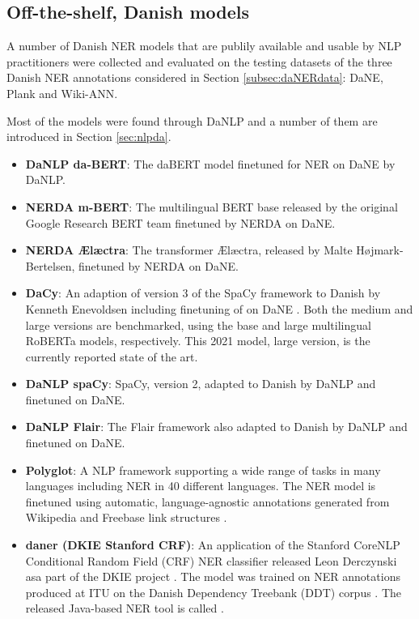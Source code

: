 \documentclass[main.tex]{subfiles}
\begin{document}
\subsection{Off-the-shelf, Danish models}
\label{sec:exidan}
A number of Danish NER models that are publily available and usable by NLP practitioners were collected and evaluated on the testing datasets of the three Danish NER annotations considered in Section \ref{subsec:daNERdata}:
DaNE, Plank and Wiki-ANN.

Most of the models were found through DaNLP \cite{danlp2021} and a number of them are introduced in Section \ref{sec:nlpda}.

\begin{itemize}
    \item \textbf{DaNLP da-BERT}: The daBERT model \cite{botxo2019dabert} finetuned for NER on DaNE by DaNLP.
    \item \textbf{NERDA m-BERT}: The multilingual BERT base released by the original Google Research BERT team \cite{devlin2019bert} finetuned by NERDA \cite{kjeldgaard2020nerda} on DaNE.
    \item \textbf{NERDA Ælæctra}: The transformer Ælæctra, released by Malte Højmark-Bertelsen, \cite{bertelsen2020lctra} finetuned by NERDA on DaNE.
    \item \textbf{DaCy}: An adaption of version 3 of the SpaCy framework \cite{honnibal2020spacy} to Danish by Kenneth Enevoldsen including finetuning of on DaNE \cite{enevoldsen2020dacy}.
        Both the medium and large versions are benchmarked, using the base and large multilingual RoBERTa \cite{conneau2020unsupervised} models, respectively.
        This 2021 model, large version, is the currently reported state of the art.
    \item \textbf{DaNLP spaCy}: SpaCy, version 2, adapted to Danish by DaNLP and finetuned on DaNE.
    \item \textbf{DaNLP Flair}: The Flair framework \cite{akbik2019flair} also adapted to Danish by DaNLP and finetuned on DaNE.
    \item \textbf{Polyglot}: A NLP framework supporting a wide range of tasks in many languages including NER in 40 different languages.
        The NER model is finetuned using automatic, language-agnostic annotations generated from Wikipedia and Freebase link structures \cite{rfou2015polyglot}.
    \item \textbf{daner (DKIE Stanford CRF)}: An application of the Stanford CoreNLP Conditional Random Field (CRF) NER classifier \cite{manning2014corenlp} released Leon Derczynski asa part of the DKIE project \cite{derc2014dkie}.
    The model was trained on NER annotations produced at ITU on the Danish Dependency Treebank (DDT) corpus \cite{kromann2003ddt}.
    The released Java-based NER tool is called \footnotemark.
\end{itemize}
\end{document}

